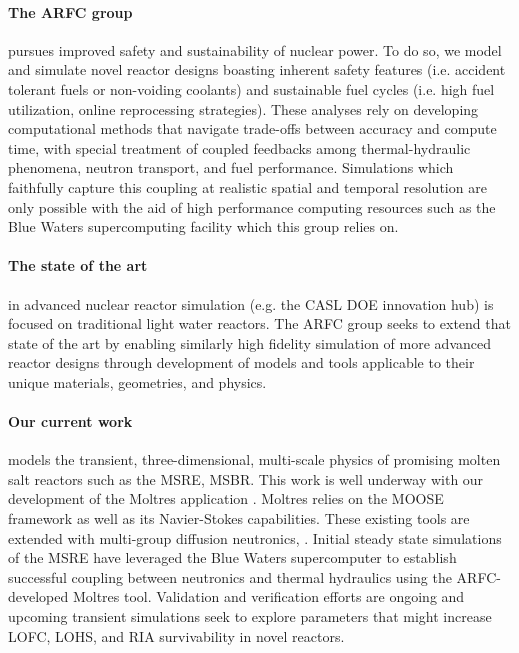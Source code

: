 \documentclass[11pt]{article}
\newcommand{\authorname}{Kathryn~D.~Huff }
\newcommand{\authorsite}{arfc.npre.illinois.edu}
\begin{document}
\pagestyle{fancy}
\lhead{\textcolor{gray}{Investigator: Prof. \authorname}}
\rhead{\textcolor{gray}{Advanced Reactors and Fuel Cycles}}
\renewcommand{\headrulewidth}{0pt}
\renewcommand{\footrulewidth}{0pt}
\fancyfoot[C]{\footnotesize \textcolor{gray}{\authorsite}}

\paragraph{The \gls{ARFC} group} pursues improved 
safety and sustainability of nuclear power. To do so, we model and simulate novel reactor designs
boasting inherent safety features (i.e. accident tolerant fuels or non-voiding 
coolants) and sustainable fuel cycles (i.e. high fuel utilization, online 
reprocessing strategies). These analyses rely on developing computational 
methods that navigate trade-offs between accuracy and compute time, with 
special treatment of coupled feedbacks among thermal-hydraulic phenomena, 
neutron transport, and fuel performance.
Simulations which faithfully capture this coupling at realistic spatial and
temporal resolution are only possible with the aid of high performance
computing resources such as the Blue Waters supercomputing facility which this 
group relies on.

\paragraph{The state of the art} in advanced nuclear reactor simulation (e.g. the 
CASL DOE innovation hub) is focused on traditional light water reactors.  The 
\gls{ARFC} group seeks to extend that state of the art by enabling similarly high 
fidelity simulation of more advanced reactor designs through development of 
models and tools applicable to their unique materials, geometries, and physics. 

\paragraph{Our current work} models the transient, three-dimensional, multi-scale physics
of promising molten salt reactors such as the \gls{MSRE}, \gls{MSBR}.
This work is well underway with our development of the Moltres application 
\cite{lindsay_moltres_2017}. Moltres relies on the \gls{MOOSE} framework 
\cite{gaston_moose:_2009} as well as its Navier-Stokes capabilities. These 
existing tools are extended with multi-group diffusion neutronics, . 
Initial steady state simulations of the \gls{MSRE} have leveraged the Blue Waters 
supercomputer to establish successful coupling between neutronics and thermal 
hydraulics using the \gls{ARFC}-developed Moltres tool. Validation and 
verification efforts are ongoing and upcoming transient simulations seek to explore 
parameters that might increase \gls{LOFC}, \gls{LOHS}, and \gls{RIA} 
survivability in novel reactors.
\end{document}
